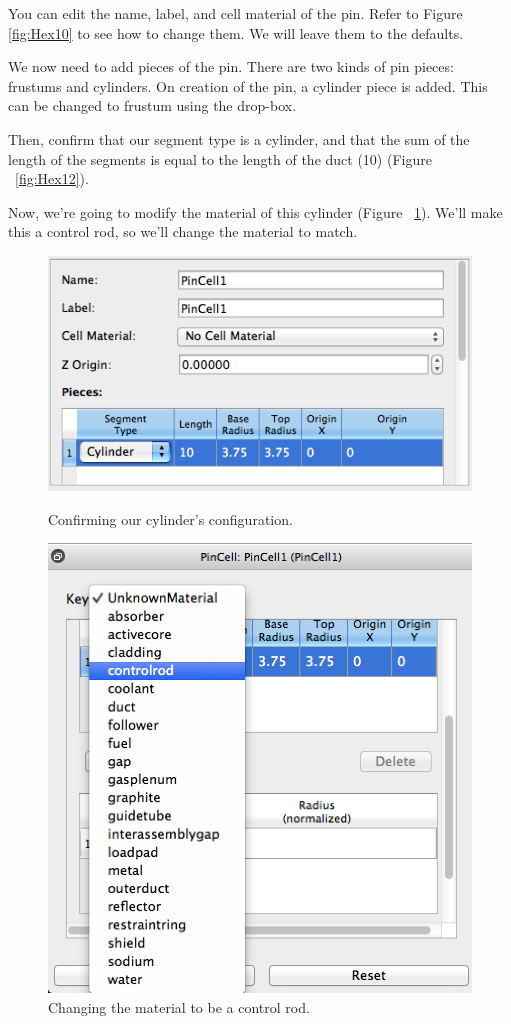 You can edit the name, label, and cell material of the pin.  Refer to Figure \ref{fig:Hex10} to see how to change them.  We will leave them to the defaults.

We now need to add pieces of the pin.  There are two kinds of pin pieces: frustums and cylinders.  On creation of the pin, a cylinder piece is added.  This can be changed to frustum using the drop-box.

Then, confirm that our segment type is a cylinder, and that the sum of the length of the segments is equal to the length of the duct (10) (Figure ~\ref{fig:Hex12}).

Now, we're going to modify the material of this cylinder (Figure ~\ref{fig:Hex13}).  We'll make this a control rod, so we'll change the material to match.

\begin{figure}[h]
\centering
\begin{minipage}{.45\textwidth}
  \centering
  	\includegraphics[width=0.85\linewidth]{Images/hex-pin-configure.png}
	\caption{Confirming our cylinder's configuration.}
	\label{fig:Hex12}
\end{minipage}%
\hspace{0.5cm}
\begin{minipage}{.40\textwidth}
  \centering
	\includegraphics[width=0.75\linewidth]{Images/hex-change-material.png}
	\caption{Changing the material to be a control rod.}
	\label{fig:Hex13}
\end{minipage}
\end{figure}

